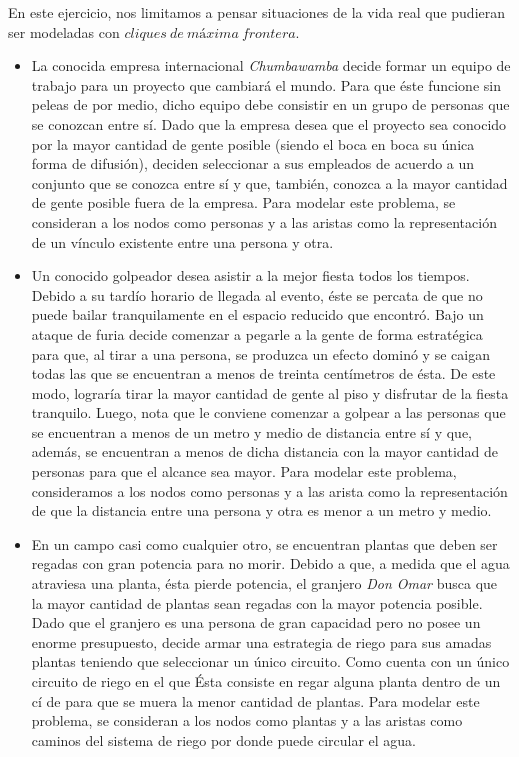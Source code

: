 En este ejercicio, nos limitamos a pensar situaciones de la vida real que pudieran ser modeladas con $cliques\ de\ máxima\ frontera$.
\begin{itemize}

\item La conocida empresa internacional \textit{Chumbawamba} decide formar un equipo de trabajo para un proyecto que cambiará el mundo. Para que éste funcione sin peleas de por medio, dicho equipo debe consistir en un grupo de personas que se conozcan entre sí. Dado que la empresa desea que el proyecto sea conocido por la mayor cantidad de gente posible (siendo el boca en boca su única forma de difusión), deciden seleccionar a sus empleados de acuerdo a un conjunto que se conozca entre sí y que, también, conozca a la mayor cantidad de gente posible fuera de la empresa. Para modelar este problema, se consideran a los nodos como personas y a las aristas como la representación de un vínculo existente entre una persona y otra.

\item Un conocido golpeador desea asistir a la mejor fiesta todos los tiempos. Debido a su tardío horario de llegada al evento, éste se percata de que no puede bailar tranquilamente en el espacio reducido que encontró. Bajo un ataque de furia decide comenzar a pegarle a la gente de forma estratégica para que, al tirar a una persona, se produzca un efecto dominó y se caigan todas las que se encuentran a menos de treinta centímetros de ésta. De este modo, lograría tirar la mayor cantidad de gente al piso y disfrutar de la fiesta tranquilo. Luego, nota que le conviene comenzar a golpear a las personas que se encuentran a menos de un metro y medio de distancia entre sí y que, además, se encuentran a menos de dicha distancia con la mayor cantidad de personas para que el alcance sea mayor. Para modelar este problema, consideramos a los nodos como personas y a las arista como la representación de que la distancia entre una persona y otra es menor a un metro y medio.  

\item En un campo casi como cualquier otro, se encuentran plantas que deben ser regadas con gran potencia para no morir. Debido a que, a medida que el agua atraviesa una planta, ésta pierde potencia, el granjero \textit{Don Omar} busca que la mayor cantidad de plantas sean regadas con la mayor potencia posible. Dado que el granjero es una persona de gran capacidad pero no posee un enorme presupuesto, decide armar una estrategia de riego para sus amadas plantas teniendo que seleccionar un único circuito. Como cuenta con un único circuito de riego en el que Ésta consiste en regar alguna planta dentro de un cí de para que se muera la menor cantidad de plantas. Para modelar este problema, se consideran a los nodos como plantas y a las aristas como caminos del sistema de riego por donde puede circular el agua. %


\end{itemize}
